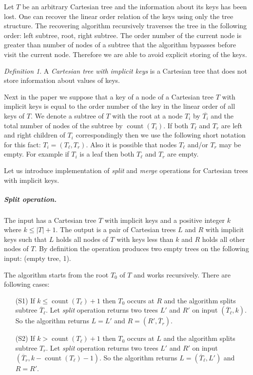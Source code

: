 ﻿\documentclass[11pt]{article}
\theoremstyle{remark}
\newtheorem{definition}{Definition}[section]
\DeclareMathOperator{\cnt}{count} \DeclareMathOperator{\splt}{\emph{split}}
\begin{document}
Let $T$ be an arbitrary Cartesian tree and the information about its keys has been lost. One can recover the linear order
relation of the keys using only the tree structure. The recovering algorithm recursively traverses the tree in the
following order: left subtree, root, right subtree. The order number of the current node is greater than number of
nodes of a subtree that the algorithm bypasses before visit the current node. Therefore we are able to avoid explicit 
storing of the keys. 

\begin{definition}
A \emph{Cartesian tree with implicit keys} is a Cartesian tree that does not store information about values of keys.
\end{definition}

Next in the paper we suppose that a key of a node of a Cartesian tree $T$ with implicit keys is equal to the order number of
the key in the linear order of all keys of $T$. We denote a subtree of $T$ with the root at a node $T_i$ by
$\overline{T_i}$ and the total number of nodes of the subtree by $\cnt(T_i)$. If both $T_\ell$ and $T_r$ are left and right children of $T_i$
correspondingly then we use the following short notation for this fact: $T_i = (T_\ell, T_r)$. Also it is possible that
nodes $T_\ell$ and/or $T_r$ may be empty. For example if $T_i$ is a leaf then both $T_\ell$ and $T_r$ are empty. 

Let us introduce implementation of \emph{split} and \emph{merge} operations for Cartesian trees with implicit keys. 

\subparagraph*{\emph{Split} operation.} The input has a Cartesian tree $T$ with implicit keys and a positive integer 
$k$ where $k \le |T|+1$. The output is a pair of Cartesian trees $L$ and $R$ with implicit keys such
that $L$ holds all nodes of $T$ with keys less than $k$ and $R$ holds all other nodes of $T$. By definition
the operation produces two empty trees on the following input: (empty tree, 1).

The algorithm starts from the root $T_0$ of $T$ and works recursively. There are following cases:

\begin{itemize}
  \item[(S1)] If $k\le\cnt(T_\ell) + 1$ then $T_0$ occurs at $R$ and the algorithm splits subtree
  $\overline{T}_\ell$. Let \emph{split} operation returns two trees $L'$ and $R'$  on input $(\overline{T}_\ell,k)$.
  So the algorithm returns $L = L'$ and $R =(R',\overline{T}_r)$.
  \item[(S2)] If $k >\cnt(T_\ell) + 1$ then $T_0$ occurs at $L$ and the algorithm splits
  subtree $T_r$. Let \emph{split} operation returns two trees $L'$ and $R'$ on input $(\overline{T}_r,k
  -\cnt(T_\ell)-1)$. So the algorithm returns $L = (\overline{T}_\ell, L')$ and $R = R'$.
\end{itemize}
\end{document}
